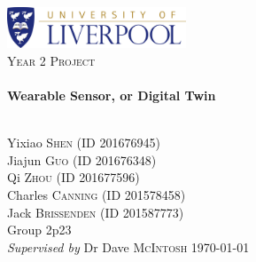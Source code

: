 \begin{titlepage}
	\begin{center}
		\includegraphics[width=0.4\textwidth]{fileForWriting/BigCrest}\\ \vspace{15 mm}
		\textsc{\Large Year 2 Project}\\ \vspace{15 mm}
		\doublespace
		\HRule \\ \vspace{8 mm}
		{\huge \bfseries Wearable Sensor, or Digital Twin}       %
		\\\vspace{4 mm}
		\HRule \\ \vspace{25 mm}

		Yixiao \textsc{Shen} (ID 201676945)      \\        %
		Jiajun \textsc{Guo} (ID 201676348)      \\        %
		Qi \textsc{Zhou} (ID 201677596)      \\        %
		Charles \textsc{Canning} (ID 201578458)      \\        %
		Jack \textsc{Brissenden} (ID 201587773)      \\        %
		Group 2p23                                 \\        %

		\vspace{15mm}
		\emph{Supervised by } Dr Dave \textsc{McIntosh}     %
		\vfill             %
		{\large \today}    %
	\end{center}
\end{titlepage}


